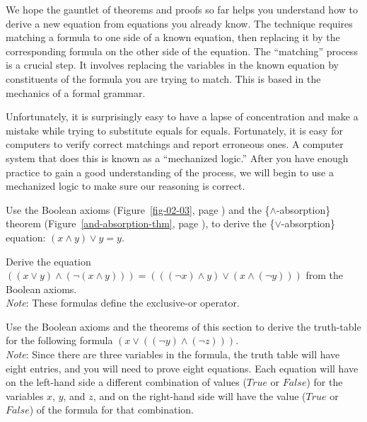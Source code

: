 We hope the gauntlet of theorems and proofs so far
helps you understand how to derive a new equation from equations you already know.
The technique requires matching a formula to one side of a known equation,
then replacing it by the corresponding formula on the other side
of the equation.
The
``matching'' process is a crucial step.
It involves replacing the variables in the known equation
by constituents of the formula you are trying to match.
This is based in the mechanics of a formal grammar.

Unfortunately, it is surprisingly easy
to have a lapse of concentration and make a mistake
while trying to substitute equals for equals.
Fortunately, it is easy for computers to verify
correct matchings and report erroneous ones.
A computer system that does this is known as a ``mechanized logic.''
After you have enough practice to gain a good understanding of the process,
we will begin to use a mechanized logic to make sure our reasoning is correct.

\begin{ExerciseList}
\Exercise
Use the Boolean axioms (Figure~\ref{fig-02-03}, page \pageref{fig-02-03}) and the
\{$\wedge$-absorption\}
theorem
(Figure~\ref{and-absorption-thm}, page \pageref{and-absorption-thm}),
to derive the \{$\vee$-absorption\} equation: $(x \wedge y) \vee y = y$.

\Exercise\label{ex:xor}
Derive the equation
$((x \vee y) \wedge (\neg(x \wedge y))) = (((\neg x) \wedge y) \vee (x \wedge (\neg y)))$
from the Boolean axioms.\\
\emph{Note}: These formulas define the
exclusive-or operator.

\Exercise
Use the Boolean axioms
and the theorems of this section to
derive the truth-table for the following formula $(x \vee ((\neg y) \wedge (\neg z)))$.\\
\emph{Note}: Since there are three variables in the formula, the truth table
will have eight entries, and you will need to prove eight equations.
Each equation will have on the left-hand side
a different combination of values ($True$ or $False$) for the variables $x$, $y$, and $z$,
and on the right-hand side will have the value ($True$ or $False$) of the formula for that combination.
\end{ExerciseList}

